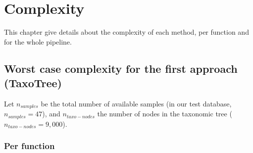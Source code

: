 \documentclass{report}
\begin{document}
\chapter{Complexity}

This chapter give details about the complexity of each method, per function and for the whole pipeline.

\section{Worst case complexity for the first approach (TaxoTree)}

Let $n_{samples}$ be the total number of available samples (in our test database, $n_{samples} = 47$), and $n_{taxo-nodes}$ the number of nodes in the taxonomic tree ($n_{taxo-nodes} = 9,000$).

\subsection{Per function}
\end{document}
